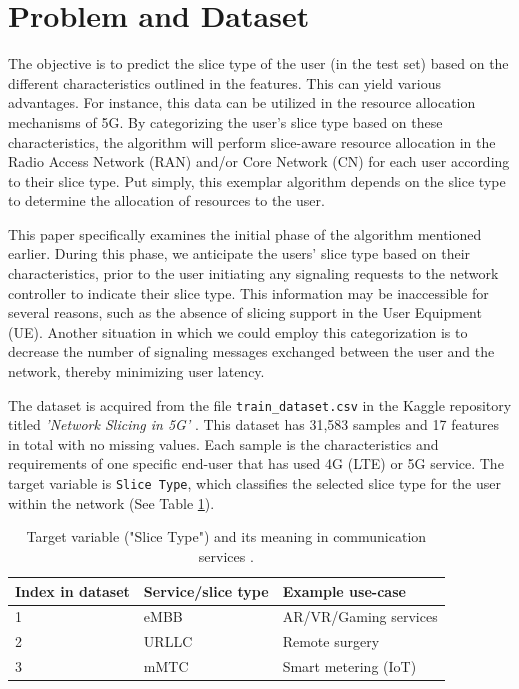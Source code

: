 \documentclass[conference]{IEEEtran}
\begin{document}
\section{Problem and Dataset} \label{dataset}%
The objective is to predict the slice type of the user (in the test set) based on the different characteristics outlined in the features. This can yield various advantages. For instance, this data can be utilized in the resource allocation mechanisms of 5G. By categorizing the user's slice type based on these characteristics, the algorithm will perform slice-aware resource allocation in the Radio Access Network (RAN) and/or Core Network (CN) for each user according to their slice type. Put simply, this exemplar algorithm depends on the slice type to determine the allocation of resources to the user.

This paper specifically examines the initial phase of the algorithm mentioned earlier. During this phase, we anticipate the users' slice type based on their characteristics, prior to the user initiating any signaling requests to the network controller to indicate their slice type. This information may be inaccessible for several reasons, such as the absence of slicing support in the User Equipment (UE). Another situation in which we could employ this categorization is to decrease the number of signaling messages exchanged between the user and the network, thereby minimizing user latency.

The dataset is acquired from the file \texttt{\footnotesize train\_dataset.csv} in the Kaggle repository titled \textit{'Network Slicing in 5G'} \cite{kaggle23kumar}. This dataset has 31,583 samples and 17 features in total with no missing values. Each sample is the characteristics and requirements of one specific end-user that has used 4G (LTE) or 5G service. The target variable is \texttt{\footnotesize Slice Type}, which classifies the selected slice type for the user within the network (See Table \ref{tab:slice-type}).

\begin{table}
    \centering
    \scriptsize
    \caption{Target variable ("Slice Type") and its meaning in communication services \cite{itu15m2083,kaggle23kumar}.}
    \begin{tabular}{l|l|l}
         Index in dataset& Service/slice type& Example use-case\\
         \hline
         1 & eMBB & AR/VR/Gaming services\\
         2 & URLLC & Remote surgery\\
         3 & mMTC & Smart metering (IoT)\\
    \end{tabular}
    \label{tab:slice-type}
    \vspace{-5mm}
\end{table}
\end{document}
